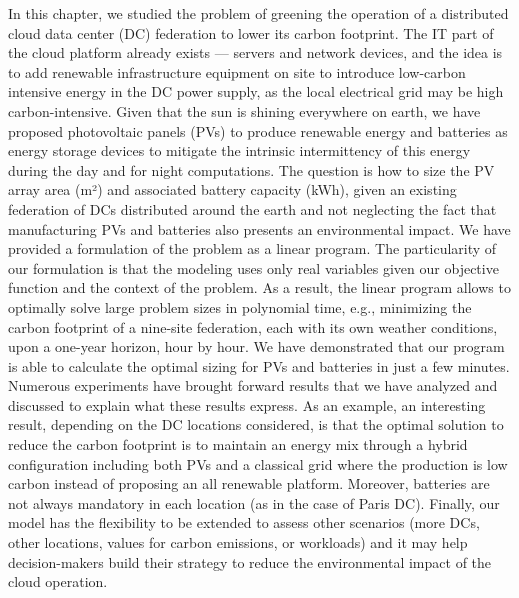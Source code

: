 In this chapter, we studied the problem of greening the operation of a distributed cloud data center (DC) federation to lower its carbon footprint. The IT part of the cloud platform already exists --- servers and network devices, and the idea is to add renewable infrastructure equipment on site to introduce low-carbon intensive energy in the DC power supply, as the local electrical grid may be high carbon-intensive. Given that the sun is shining everywhere on earth, we have proposed photovoltaic panels (PVs) to produce renewable energy and batteries as energy storage devices to mitigate the intrinsic intermittency of this energy during the day and for night computations. The question is how to size the PV array area (m²) and associated battery capacity (kWh), given an existing federation of DCs distributed around the earth and not neglecting the fact that manufacturing PVs and batteries also presents an environmental impact. We have provided a formulation of the problem as a linear program. The particularity of our formulation is that the modeling uses only real variables given our objective function and the context of the problem. As a result, the linear program allows to optimally solve large problem sizes in polynomial time, e.g., minimizing the carbon footprint of a nine-site federation, each with its own weather conditions, upon a one-year horizon, hour by hour. We have demonstrated that our program is able to calculate the optimal sizing for PVs and batteries in just a few minutes. Numerous experiments have brought forward results that we have analyzed and discussed to explain what these results express. As an example, an interesting result, depending on the DC locations considered, is that the optimal solution to reduce the carbon footprint is to maintain an energy mix through a hybrid configuration including both PVs and a classical grid where the production is low carbon instead of proposing an all renewable platform. Moreover, batteries are not always mandatory in each location (as in the case of Paris DC). Finally, our model has the flexibility to be extended to assess other scenarios (more DCs, other locations, values for  carbon emissions, or workloads) and it may help decision-makers build their strategy to reduce the environmental impact of the cloud operation. 

